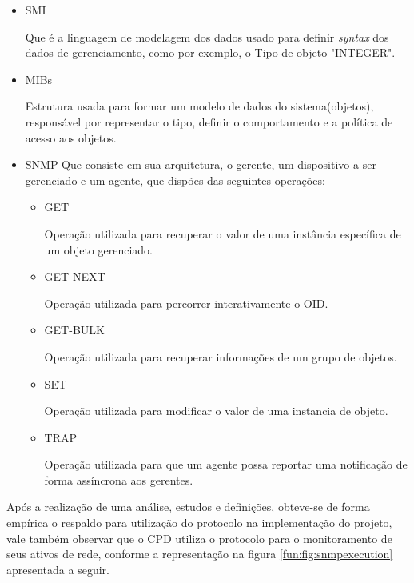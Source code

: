     \begin{itemize}
    \item \acrshort{SMI}
    
    Que é a linguagem de modelagem dos dados usado para definir \textit{syntax} dos dados de gerenciamento, como por exemplo, o Tipo de objeto "INTEGER".
    
    \item \acrshort{MIBs}
    
    Estrutura usada para formar um modelo de dados do sistema(objetos), responsável por representar o tipo, definir o comportamento e a política de acesso aos objetos.
    
    \item \acrshort{SNMP}
    Que consiste em sua arquitetura, o gerente, um dispositivo a ser gerenciado e um agente, que dispões das seguintes operações:
    
        \begin{itemize}
        \item GET
        
        Operação utilizada para recuperar o valor de uma instância específica de um objeto gerenciado.
        
        \item GET-NEXT
        
        Operação utilizada para percorrer interativamente o \acrshort{OID}.
        
        \item GET-BULK
        
        Operação utilizada para recuperar informações de um grupo de objetos.
        \item SET
        
        Operação utilizada para modificar o valor de uma instancia de objeto.
        \item TRAP
        
        Operação utilizada para que um agente possa reportar uma notificação de forma assíncrona aos gerentes.
        
        \end{itemize}
        
    \end{itemize}
    
Após a realização de uma análise, estudos e definições, obteve-se de forma empírica o respaldo para utilização do protocolo na implementação do projeto, vale também observar que o \acrshort{CPD} utiliza o protocolo para o monitoramento de seus ativos de rede, conforme a representação na figura \ref{fun:fig:snmpexecution} apresentada a seguir.

